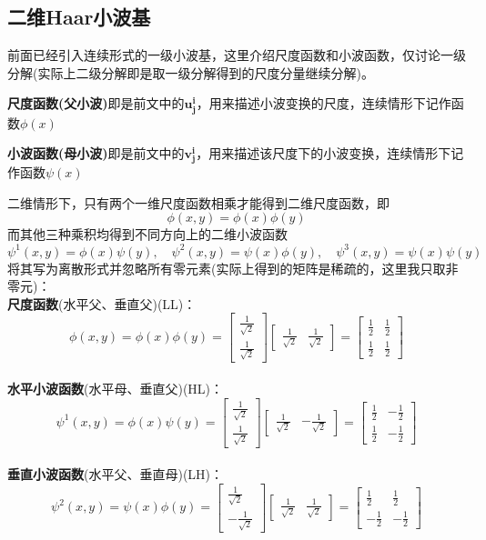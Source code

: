 \documentclass{article}
\begin{document}
\begin{CJK}{UTF8}{gbsn}
\section{二维Haar小波基}
	前面已经引入连续形式的一级小波基，这里介绍尺度函数和小波函数，仅讨论一级分解(实际上二级分解即是取一级分解得到的尺度分量继续分解)。\par
	\textbf{尺度函数(父小波)}即是前文中的$\boldsymbol{u^i_j}$，用来描述小波变换的尺度，连续情形下记作函数$\phi(x)$\par
	\textbf{小波函数(母小波)}即是前文中的$\boldsymbol{v^i_j}$，用来描述该尺度下的小波变换，连续情形下记作函数$\psi(x)$\par
	二维情形下，只有两个一维尺度函数相乘才能得到二维尺度函数，即$$\phi(x,y)=\phi(x)\phi(y)$$
	而其他三种乘积均得到不同方向上的二维小波函数$$\psi^1(x,y)=\phi(x)\psi(y),\quad\psi^2(x,y)=\psi(x)\phi(y),\quad\psi^3(x,y)=\psi(x)\psi(y)$$
	将其写为离散形式并忽略所有零元素(实际上得到的矩阵是稀疏的，这里我只取非零元)：\\
	\textbf{尺度函数}(水平父、垂直父)(LL)：
	$$\phi(x,y)=\phi(x)\phi(y)=\begin{bmatrix}\frac{1}{\sqrt{2}}\\\frac{1}{\sqrt{2}}\end{bmatrix}\begin{bmatrix}\frac{1}{\sqrt{2}}&\frac{1}{\sqrt{2}}\end{bmatrix}=\begin{bmatrix}\frac{1}{2}&\frac{1}{2}\\\frac{1}{2}&\frac{1}{2}\end{bmatrix}$$\\
	\textbf{水平小波函数}(水平母、垂直父)(HL)：
	$$\psi^1(x,y)=\phi(x)\psi(y)=\begin{bmatrix}\frac{1}{\sqrt{2}}\\\frac{1}{\sqrt{2}}\end{bmatrix}\begin{bmatrix}\frac{1}{\sqrt{2}}&-\frac{1}{\sqrt{2}}\end{bmatrix}=\begin{bmatrix}\frac{1}{2}&-\frac{1}{2}\\\frac{1}{2}&-\frac{1}{2}\end{bmatrix}$$\\
	\textbf{垂直小波函数}(水平父、垂直母)(LH)：
	$$\psi^2(x,y)=\psi(x)\phi(y)=\begin{bmatrix}\frac{1}{\sqrt{2}}\\-\frac{1}{\sqrt{2}}\end{bmatrix}\begin{bmatrix}\frac{1}{\sqrt{2}}&\frac{1}{\sqrt{2}}\end{bmatrix}=\begin{bmatrix}\frac{1}{2}&\frac{1}{2}\\-\frac{1}{2}&-\frac{1}{2}\end{bmatrix}$$\\

\end{CJK}
\end{document}
